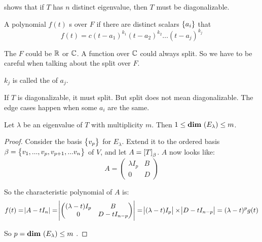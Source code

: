  shows that if $T$ has $n$ distinct eigenvalue, then $T$ must be diagonalizable.

\begin{definition}
    A polynomial $f(t)$ s over $F$ if there are distinct scalars $\set{a_i}$ that
    \begin{equation}
        f(t) = c (t - a_1)^{k_1} (t - a_2)^{k_2} \hdots (t - a_j)^{k_j}
    \end{equation}
    
    The $F$ could be $\mathbb{R}$ or $\mathbb{C}$. A function over $\mathbb{C}$ could always split. So we have to be careful when talking about the split over $F$.
    
    $k_j$ is called the  of $a_j$.
\end{definition}

If $T$ is diagonalizable, it must split. But split does not mean diagonalizable. The edge cases happen when some $a_i$ are the same.


\begin{theorem}
    Let $\lambda$ be an eigenvalue of $T$ with multiplicity $m$. Then $1 \leq \dimension{E_\lambda} \leq m$.
\end{theorem}
\begin{proof}
    Consider the basis $\set{v_p}$ for $E_\lambda$. Extend it to the ordered basis $\beta = \set{v_1, ..., v_p, v_{p+1}, ... v_n}$ of $V$, and let $A = \coordinate{T}_\beta$. $A$ now looks like:
    \begin{equation*}
        A = \begin{pmatrix}
            \lambda I_p & B \\
            0 & D
        \end{pmatrix}
    \end{equation*}
    
    So the characteristic polynomial of $A$ is:
    \begin{equation*}
        \begin{aligned}
            f(t) = \abs{A - t I_n}  = \abs{\begin{pmatrix}
                (\lambda - t) I_p & B \\
                0 & D - t I_{n-p}
            \end{pmatrix}} = \abs{(\lambda - t) I_p} \times \abs{D - t I_{n-p}}  = (\lambda - t)^p g(t)
        \end{aligned}
    \end{equation*}
    
    So $p= \dimension{E_\lambda} \leq m$ .
\end{proof}

